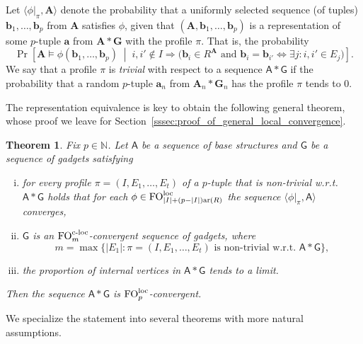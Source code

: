 \documentclass[11pt]{article}
\theoremstyle{plain}
\newtheorem{theorem}{Theorem}[section]
\theoremstyle{definition}
\theoremstyle{remark}
\DeclareMathOperator\aritysym{ar}
\newcommand{\arity}[1]{{\aritysym({#1})}}
\newcommand{\N}{\mathbb{N}}
\DeclareMathOperator\FO{FO}
\newcommand{\FOloc}[1]{\FO_{#1}^\textnormal{loc}}
\newcommand{\FOcloc}[1]{\FO_{#1}^{\textnormal{c-loc}}}
\newcommand{\stonepar}[2]{\langle #1, #2 \rangle}
\newcommand{\str}[1]{\mathbf{#1}}
\newcommand{\strseq}[1]{{\boldsymbol{\mathsf{#1}}}}
\newcommand{\tpl}[1]{{\bm{#1}}}
\begin{document}
Let $\stonepar{\phi|_\pi}{\str{A}}$ denote the probability that a uniformly selected sequence (of tuples) $\tpl{b}_1, \dots, \tpl{b}_p$ from $\str{A}$ satisfies $\phi$, given that $(\str{A}, \tpl{b}_1, \dots, \tpl{b}_p)$ is a representation of some $p$-tuple $\tpl{a}$ from $\str{A}*\str{G}$ with the profile $\pi$.
That is, the probability
\[
    \Pr
    \left[
        \str{A} \models \phi(\tpl{b}_1, \dots, \tpl{b}_p) 
        \;\middle|\;
            i,i'\not\in I \Rightarrow             
            \big(
                \tpl{b}_i \in R^\str{A} 
                \text{ and } 
                \tpl{b}_i = \tpl{b}_{i'} \Leftrightarrow \exists j : i,i' \in E_j
            \big)
    \right]
    .
\]
We say that a profile $\pi$ is \emph{trivial} with respect to a sequence $\strseq{A}*\strseq{G}$ if the probability that a random $p$-tuple $\tpl{a}_n$ from $\str{A}_n*\str{G}_n$ has the profile $\pi$ tends to $0$.

The representation equivalence is key to obtain the following general theorem, whose proof we leave for Section~\ref{sssec:proof_of_general_local_convergence}.

\begin{theorem}\label{thm:general_local_convergence}
    Fix $p \in \N$.
    Let $\strseq{A}$ be a sequence of base structures and $\strseq{G}$ be a sequence of gadgets satisfying
    \begin{enumerate}[(i)]
        \item for every profile $\pi = (I,E_1, \dots, E_t)$ of a $p$-tuple that is non-trivial w.r.t. $\strseq{A}*\strseq{G}$ holds that for each $\phi \in \FOloc{|I|+(p-|I|)\arity{R}}$ the sequence $\stonepar{\phi|_\pi}{\strseq{A}}$ converges,
        \item $\strseq{G}$ is an $\FOcloc{m}$-convergent sequence of gadgets, where
        \[
            m = \max \{ |E_1| : \pi = (I,E_1, \dots, E_t) \text{ is non-trivial w.r.t. } \strseq{A}*\strseq{G} \}
            ,
        \]
        \item the proportion of internal vertices in $\strseq{A}*\strseq{G}$ tends to a limit.
    \end{enumerate}
    Then the sequence $\strseq{A}*\strseq{G}$ is $\FOloc{p}$-convergent.
\end{theorem}

We specialize the statement into several theorems with more natural assumptions.
\end{document}
